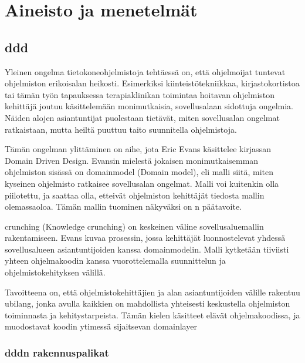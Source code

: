 \hypertarget{aineisto-ja-menetelmuxe4t}{%
\chapter{Aineisto ja menetelmät}\label{aineisto-ja-menetelmuxe4t}}

\hypertarget{section}{%
\section{\texorpdfstring{\gls{ddd}}{}}\label{section}}

Yleinen ongelma tietokoneohjelmistoja tehtäessä on, että ohjelmoijat
tuntevat ohjelmiston erikoisalan heikosti. Esimerkiksi
kiinteistötekniikkaa, kirjastokortistoa tai tämän työn tapauksessa
terapiaklinikan toimintaa hoitavan ohjelmiston kehittäjä joutuu
käsittelemään monimutkaisia, sovellusalaan sidottuja ongelmia. Näiden
alojen asiantuntijat puolestaan tietävät, miten sovellusalan ongelmat
ratkaistaan, mutta heiltä puuttuu taito suunnitella ohjelmistoja.

Tämän ongelman ylittäminen on aihe, jota Eric Evans käsittelee kirjassan
Domain Driven Design. Evansin mielestä jokaisen monimutkaisemman
ohjelmiston sisässä on \gls{domainmodel} (Domain model), eli malli
siitä, miten kyseinen ohjelmisto ratkaisee sovellusalan ongelmat. Malli
voi kuitenkin olla piilotettu, ja saattaa olla, etteivät ohjelmiston
kehittäjät tiedosta mallin olemassaoloa. Tämän mallin tuominen näkyväksi
on n päätavoite.

\Gls{crunching} (Knowledge crunching) on keskeinen väline
sovellusaluemallin rakentamiseen. Evans kuvaa prosessin, jossa
kehittäjät luonnostelevat yhdessä sovellusalueen asiantuntijoiden kanssa
\gls{domainmodel}in. Malli kytketään tiiviisti yhteen ohjelmakoodin
kanssa vuorottelemalla suunnittelun ja ohjelmistokehityksen välillä.
\cite[s. 13]{evans:ddd}

Tavoitteena on, että ohjelmistokehittäjien ja alan asiantuntijoiden
välille rakentuu \gls{ubilang}, jonka avulla kaikkien on mahdollista
yhteisesti keskustella ohjelmiston toiminnasta ja kehitystarpeista.
Tämän kielen käsitteet elävät ohjelmakoodissa, ja muodostavat koodin
ytimessä sijaitsevan \gls{domainlayer}

\hypertarget{n-rakennuspalikat}{%
\subsection{\texorpdfstring{\gls{ddd}n
rakennuspalikat}{n rakennuspalikat}}\label{n-rakennuspalikat}}

